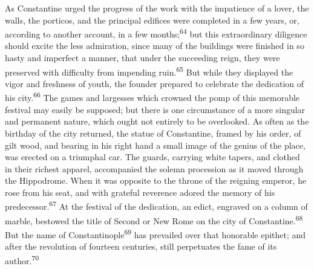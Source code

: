 
As Constantine urged the progress of the work with the impatience
of a lover, the walls, the porticos, and the principal edifices
were completed in a few years, or, according to another account,
in a few months;\textsuperscript{64} but this extraordinary diligence should
excite the less admiration, since many of the buildings were
finished in so hasty and imperfect a manner, that under the
succeeding reign, they were preserved with difficulty from
impending ruin.\textsuperscript{65} But while they displayed the vigor and
freshness of youth, the founder prepared to celebrate the
dedication of his city.\textsuperscript{66} The games and largesses which crowned
the pomp of this memorable festival may easily be supposed; but
there is one circumstance of a more singular and permanent
nature, which ought not entirely to be overlooked. As often as
the birthday of the city returned, the statue of Constantine,
framed by his order, of gilt wood, and bearing in his right hand
a small image of the genius of the place, was erected on a
triumphal car. The guards, carrying white tapers, and clothed in
their richest apparel, accompanied the solemn procession as it
moved through the Hippodrome. When it was opposite to the throne
of the reigning emperor, he rose from his seat, and with grateful
reverence adored the memory of his predecessor.\textsuperscript{67} At the
festival of the dedication, an edict, engraved on a column of
marble, bestowed the title of Second or New Rome on the city of
Constantine.\textsuperscript{68} But the name of Constantinople\textsuperscript{69} has prevailed
over that honorable epithet; and after the revolution of fourteen
centuries, still perpetuates the fame of its author.\textsuperscript{70}


